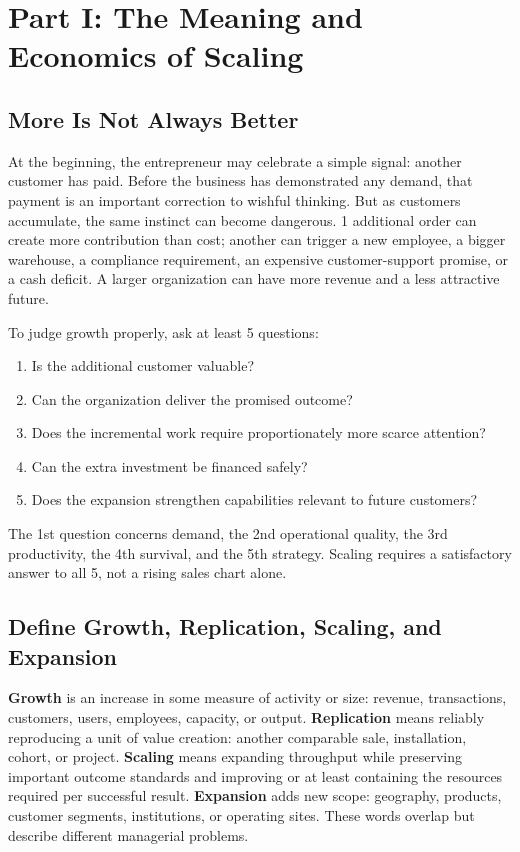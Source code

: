 \section*{Part I: The Meaning and Economics of Scaling}

\subsection{More Is Not Always Better}
\label{sec:more_not_always_better}

At the beginning, the entrepreneur may celebrate a simple signal: another customer has paid. Before the business has demonstrated any demand, that payment is an important correction to wishful thinking. But as customers accumulate, the same instinct can become dangerous. 1 additional order can create more contribution than cost; another can trigger a new employee, a bigger warehouse, a compliance requirement, an expensive customer-support promise, or a cash deficit. A larger organization can have more revenue and a less attractive future.

To judge growth properly, ask at least 5 questions:
\begin{enumerate}
    \item Is the additional customer valuable?
    \item Can the organization deliver the promised outcome?
    \item Does the incremental work require proportionately more scarce attention?
    \item Can the extra investment be financed safely?
    \item Does the expansion strengthen capabilities relevant to future customers?
\end{enumerate}
The 1st question concerns demand, the 2nd operational quality, the 3rd productivity, the 4th survival, and the 5th strategy. Scaling requires a satisfactory answer to all 5, not a rising sales chart alone.

\subsection{Define Growth, Replication, Scaling, and Expansion}
\label{sec:define_growth_scaling}

\textbf{Growth} is an increase in some measure of activity or size: revenue, transactions, customers, users, employees, capacity, or output. \textbf{Replication} means reliably reproducing a unit of value creation: another comparable sale, installation, cohort, or project. \textbf{Scaling} means expanding throughput while preserving important outcome standards and improving or at least containing the resources required per successful result. \textbf{Expansion} adds new scope: geography, products, customer segments, institutions, or operating sites. These words overlap but describe different managerial problems.


